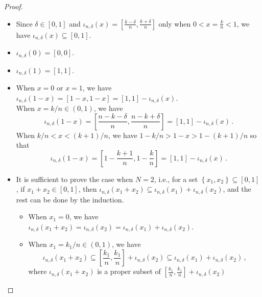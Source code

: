 \documentclass[12pt]{iopart}
\theoremstyle{plain}
\theoremstyle{definition}
\theoremstyle{remark}
\begin{document}
\begin{proof}~
\begin{itemize}
\item Since $\delta\in\left[0,1\right]$ and $\iota_{n,\delta}\left(x\right)=\left[\frac{k-\delta}{n},\frac{k+\delta}{n}\right]$
only when $0<x=\frac{k}{n}<1$, we have $\iota_{n,\delta}\left(x\right)\subseteq\left[0,1\right]$.
\item $\iota_{n,\delta}\left(0\right)=\left[0,0\right]$. 
\item $\iota_{n,\delta}\left(1\right)=\left[1,1\right]$. 
\item When $x=0$ or $x=1$, we have $\iota_{n,\delta}\left(1-x\right)=\left[1-x,1-x\right]=\left[1,1\right]-\iota_{n,\delta}\left(x\right)$.\\
When $x=k/n\in\left(0,1\right)$, we have 
\begin{equation}
\iota_{n,\delta}\left(1-x\right)=\left[\frac{n-k-\delta}{n},\frac{n-k+\delta}{n}\right]=\left[1,1\right]-\iota_{n,\delta}\left(x\right)\,.
\end{equation}
When $k/n<x<\left(k+1\right)/n$, we have $1-k/n>1-x>1-\left(k+1\right)/n$
so that 
\begin{equation}
\iota_{n,\delta}\left(1-x\right)=\left[1-\frac{k+1}{n},1-\frac{k}{n}\right]=\left[1,1\right]-\iota_{n,\delta}\left(x\right)\,.
\end{equation}
\item It is sufficient to prove the case when $N=2$, i.e., for a set $\left\{ x_{1},x_{2}\right\} \subseteq\left[0,1\right]$,
if $x_{1}+x_{2}\in\left[0,1\right]$, then $\iota_{n,\delta}\left(x_{1}+x_{2}\right)\subseteq\iota_{n,\delta}\left(x_{1}\right)+\iota_{n,\delta}\left(x_{2}\right)$,
and the rest can be done by the induction. 
\begin{itemize}
\item When $x_{1}=0$, we have $\iota_{n,\delta}\left(x_{1}+x_{2}\right)=\iota_{n,\delta}\left(x_{2}\right)=\iota_{n,\delta}\left(x_{1}\right)+\iota_{n,\delta}\left(x_{2}\right)$.
\item When $x_{1}=k_{1}/n\in\left(0,1\right)$, we have 
\begin{equation}
\iota_{n,\delta}\left(x_{1}+x_{2}\right)\subseteq\left[\frac{k_{1}}{n},\frac{k_{1}}{n}\right]+\iota_{n,\delta}\left(x_{2}\right)\subseteq\iota_{n,\delta}\left(x_{1}\right)+\iota_{n,\delta}\left(x_{2}\right)\,,
\end{equation}
where $\iota_{n,\delta}\left(x_{1}+x_{2}\right)$ is a proper subset
of $\left[\frac{k_{1}}{n},\frac{k_{1}}{n}\right]+\iota_{n,\delta}\left(x_{2}\right)$

\end{itemize}
\end{itemize}
\end{proof}
\end{document}
